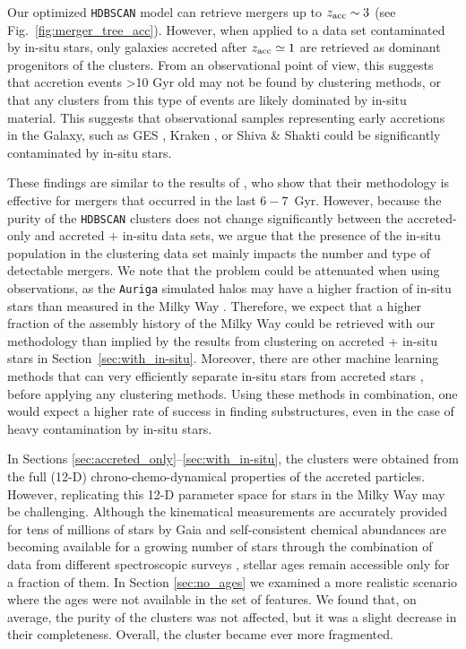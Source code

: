 Our optimized \texttt{HDBSCAN} model can retrieve mergers up to $z_{\rm acc}\sim3$ (see Fig.~\ref{fig:merger_tree_acc}). However, when applied to a data set contaminated by in-situ stars, only galaxies accreted after $z_{\rm acc} \simeq 1$ are retrieved as dominant progenitors of the clusters. From an observational point of view, this suggests that accretion events >10 Gyr old may not be found by clustering methods, or that any clusters from this type of events are likely dominated by in-situ material. This suggests that observational samples representing early accretions in the Galaxy, such as  GES \citep{Helmi2018,Belokurov2018}, Kraken \citep{Kruijssen2019b}, or Shiva \& Shakti \citep{Malhan2024} could be significantly contaminated by in-situ stars.

These findings are similar to the results of \citet{Thomas2025}, who show that their methodology is effective for mergers that occurred in the last $6-7$~Gyr. However, because the purity of the \texttt{HDBSCAN} clusters does not change significantly between the accreted-only and accreted + in-situ data sets, we argue that the presence of the in-situ population in the clustering data set mainly impacts the number and type of detectable mergers. We note that the problem could be attenuated when using observations, as the \texttt{Auriga} simulated halos may have a higher fraction of in-situ stars than measured in the Milky Way \citep{Monachesi2019}. Therefore, we expect that a higher fraction of the assembly history of the Milky Way could be retrieved with our methodology than implied by the results from clustering on accreted + in-situ stars in Section~\ref{sec:with_in-situ}. Moreover, there are other machine learning methods that can very efficiently separate in-situ stars from accreted stars \citep{Ostdiek2020,Sante2024}, before applying any clustering methods. Using these methods in combination, one would expect a higher rate of success in finding substructures, even in the case of heavy contamination by in-situ stars.

In Sections \ref{sec:accreted_only}--\ref{sec:with_in-situ}, the clusters were obtained from the full (12-D) chrono-chemo-dynamical properties of the accreted particles. However, replicating this 12-D parameter space for stars in the Milky Way may be challenging. Although the kinematical measurements are accurately provided for tens of millions of stars by Gaia and self-consistent chemical abundances are becoming available for a growing number of stars through the combination of data from different spectroscopic surveys \citep{Thomas2024,Horta2025}, stellar ages remain accessible only for a fraction of them. In Section \ref{sec:no_ages} we examined a more realistic scenario where the ages were not available in the set of features. We found that, on average, the purity of the clusters was not affected, but it was a slight decrease in their completeness. Overall, the cluster became ever more fragmented. 

